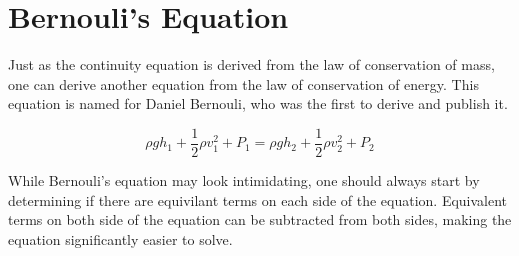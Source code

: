 \section{Bernouli's Equation}

Just as the continuity equation is derived from the law of conservation of mass, one can derive another equation from the law of conservation of energy.  This equation is named for Daniel Bernouli, who was the first to derive and publish it.

				\begin{mdframed}[backgroundcolor=orange!20!white]
		\begin{equation}
			\rho g h_1 + \frac{1}{2} \rho v_1^2 + P_1 = \rho g h_2 + \frac{1}{2} \rho v_2^2 + P_2
			\label{equation:bernouli}
		\end{equation}
	\end{mdframed}	
While Bernouli's equation may look intimidating, one should always start by determining if there are equivilant terms on each side of the equation.  Equivalent terms on both side of the equation can be subtracted from both sides, making the equation significantly easier to solve.  



